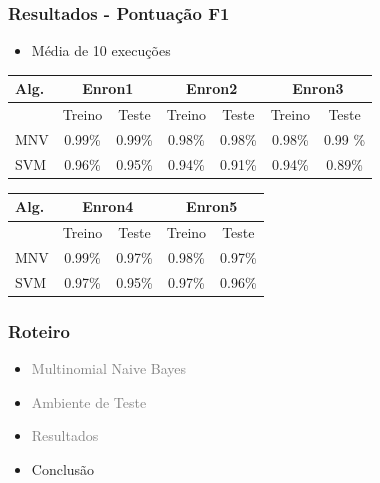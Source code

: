 \documentclass[10pt]{beamer}
\begin{document}
\begin{frame}
 \frametitle{Resultados - Pontuação F1}

 \begin{itemize}
    \item Média de 10 execuções
  \end{itemize}


  \begin{table}[!htb]
      \footnotesize
      \centering
      \begin{tabular}{l|cc|cc|cc}
      \toprule
      Alg. & \multicolumn{2}{c}{Enron1} & \multicolumn{2}{|c}{Enron2} & \multicolumn{2}{|c}{Enron3} \\
      \toprule
      \     & Treino & Teste     & Treino & Teste    &  Treino & Teste    \\
      \midrule
      MNV &    0.99\% &  0.99\%   & 0.98\% & 0.98\%   & 0.98\% & 0.99 \%  \\
      SVM &    0.96\% &  0.95\%   & 0.94\% & 0.91\%   & 0.94\% & 0.89\%   \\
      \bottomrule
      \end{tabular}

      \end{table}


    \begin{table}[!htb]
      \footnotesize
      \centering
      \begin{tabular}{l|cc|cc}
      \toprule
      Alg. & \multicolumn{2}{c}{Enron4} & \multicolumn{2}{|c}{Enron5} \\
      \toprule
      \     & Treino & Teste     & Treino & Teste   \\
      \midrule
      MNV &    0.99\% &  0.97\%   & 0.98\% & 0.97\% \\
      SVM &    0.97\% &  0.95\%   & 0.97\% & 0.96\%  \\
      \bottomrule
      \end{tabular}

      \end{table}


\end{frame}



\begin{frame}
  \frametitle{Roteiro}

  \begin{itemize}

    \item[\color{gray}{$\bullet$}] \textcolor{gray}{Multinomial Naive Bayes}

    \item[\color{gray}{$\bullet$}] \textcolor{gray}{Ambiente de Teste}

    \item[\color{gray}{$\bullet$}] \textcolor{gray}{Resultados}

    \item Conclusão

  \end{itemize}

\end{frame}
\end{document}
